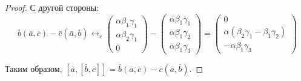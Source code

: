 \begin{proof}
    	С другой стороны:
    	\[\overline{b}(\overline{a}, \overline{c}) - \overline{c}(\overline{a}, \overline{b}) \leftrightarrow_{e}
    	\begin{pmatrix}
    		\alpha\beta_1\gamma_1\\\alpha\beta_2\gamma_1\\0
    	\end{pmatrix}
    	-
    	\begin{pmatrix}
    		\alpha\beta_1\gamma_1\\\alpha\beta_1\gamma_2\\\alpha\beta_1\gamma_3
    	\end{pmatrix}
    	=
    	\begin{pmatrix}
    		0\\\alpha(\beta_2\gamma_1 - \beta_1\gamma_2)\\-\alpha\beta_1\gamma_3
    	\end{pmatrix}\]
    
    	Таким образом, $[\overline{a}, [\overline{b}, \overline{c}]] = \overline{b}(\overline{a}, \overline{c}) - \overline{c}(\overline{a}, \overline{b})$. 
    \end{proof}